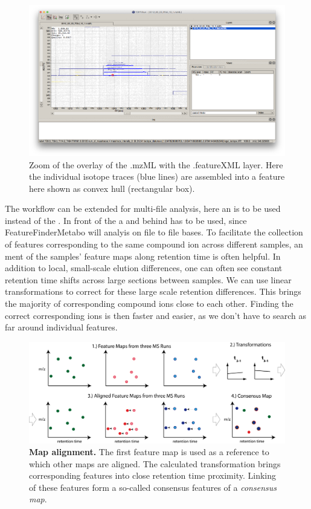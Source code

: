 \begin{figure}[htbp]
  \centering
  \includegraphics[width=\textwidth]{graphics/metabo/ToppView_4.png}
  \caption{Zoom of the overlay of the .mzML with the .featureXML layer. Here the individual isotope traces (blue lines) are assembled into a feature here shown as convex hull (rectangular box).}
  \label{fig:ToppView_4}
\end{figure}

The workflow can be extended for multi-file analysis, here an  is to be used instead of the .  In front of the  a  and behind  has to be used, since FeatureFinderMetabo will analyis on file to file bases. 
\newline
To facilitate the collection of features corresponding to the same compound ion across different samples, an 
ment of the samples' feature maps along retention time is often helpful. In addition to local, small-scale elution differences, one can often see constant retention time shifts across large sections between samples. We can use linear transformations to correct for these large scale retention differences. This  brings the majority of corresponding compound ions close to each other. Finding the correct corresponding ions is then faster and easier, as we don't have to search as far around individual features.

\begin{figure}[!htbp]
	\centering
	\includegraphics[width=\textwidth]{graphics/metabo/align.png}
	\caption[Map alignment]
	{
	\textbf{Map alignment.} The first feature map is used as a reference to which other maps are aligned. The calculated transformation brings corresponding features into close retention time proximity. Linking of these features form a so-called consensus features of a \textit{consensus map}.
	}
	\label{bg_alignment}
\end{figure}

